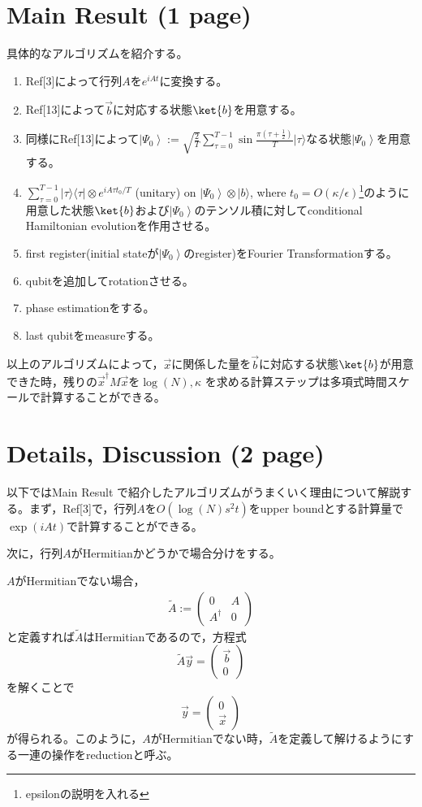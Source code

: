 \documentclass[b5paper,papersize,dvipdfmx,fleqn]{jsarticle}
\begin{document}
\section{Main Result (1 page)}

具体的なアルゴリズムを紹介する。
\begin{enumerate}
  \item Ref[3]によって行列$A$を$e^{iAt}$に変換する。
  \item Ref[13]によって$\vec{b}$に対応する状態$\ket{b}$を用意する。
  \item 同様にRef[13]によって$\displaystyle \left|\Psi_{0}\right\rangle:=\sqrt{\frac{2}{T}} \sum_{\tau=0}^{T-1} \sin \frac{\pi\left(\tau+\frac{1}{2}\right)}{T}|\tau\rangle$なる状態$\left|\Psi_{0}\right\rangle$を用意する。
  \item $\displaystyle \sum_{\tau=0}^{T-1}|\tau\rangle\langle\tau| \otimes e^{i A \tau t_{0} / T}$ (unitary) on $\left|\Psi_{0}\right\rangle \otimes|b\rangle$, where $t_{0}=O(\kappa / \epsilon)$\footnote{epsilonの説明を入れる}のように用意した状態$\ket{b}$および$\left|\Psi_{0}\right\rangle$のテンソル積に対してconditional Hamiltonian evolutionを作用させる。
  \item first register(initial stateが$\left|\Psi_{0}\right\rangle$のregister)をFourier Transformationする。
  \item qubitを追加してrotationさせる。
  \item phase estimationをする。
  \item last qubitをmeasureする。
\end{enumerate}
以上のアルゴリズムによって，$\vec{x}$に関係した量を$\vec{b}$に対応する状態$\ket{b}$が用意できた時，残りの$\vec{x}^\dagger M \vec{x}$を$\log(N),\kappa $ を求める計算ステップは多項式時間スケールで計算することができる。



\section{Details, Discussion (2 page)}
以下ではMain Result で紹介したアルゴリズムがうまくいく理由について解説する。まず，Ref[3]で，行列$A$を$O(\log(N)s^2t)$をupper boundとする計算量で$\exp(iAt)$で計算することができる。

次に，行列$A$がHermitianかどうかで場合分けをする。

$A$がHermitianでない場合，
\begin{eqnarray}
  \tilde{A}:= \left(\begin{array}{cc}
0 & A \\
A^{\dagger} & 0
\end{array}\right)
\end{eqnarray}
と定義すれば$\tilde{A}$はHermitianであるので，方程式
$$
\tilde{A} \vec{y}=\left(\begin{array}{l}
\vec{b} \\
0
\end{array}\right)
$$
を解くことで
$$
\vec{y}=\left(\begin{array}{l}
0 \\
\vec{x}
\end{array}\right)
$$
が得られる。このように，$A$がHermitianでない時，$\tilde{A}$を定義して解けるようにする一連の操作をreductionと呼ぶ。
\end{document}
